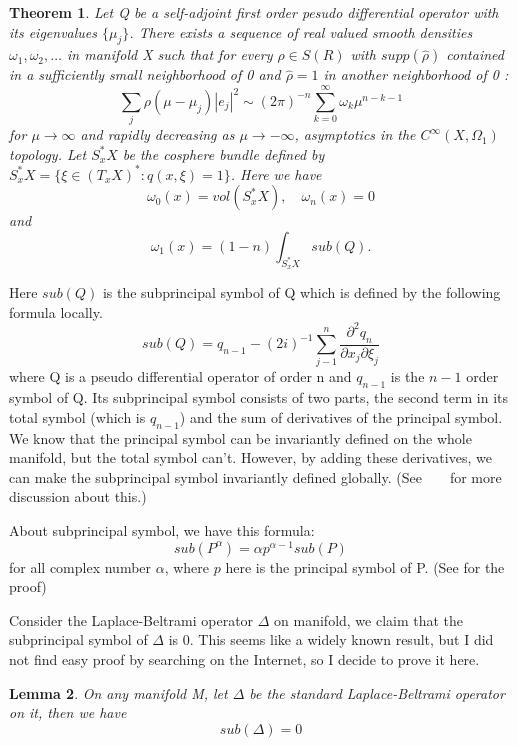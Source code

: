 \documentclass[10pt]{amsart}
\newtheorem{theorem}{Theorem}
\newtheorem{lemma}[theorem]{Lemma}
\newcommand{\1}{\mathbb{1}}
\begin{document}
\begin{theorem} \label{DG1}
    Let Q be a self-adjoint first order pesudo differential operator with its eigenvalues $\{\mu_j\}$. There exists a sequence of real valued smooth densities $\omega_1, \omega_2,\dots$ in manifold X such that for every $\rho \in S(R)$ with $supp(\hat{\rho})$ contained in a sufficiently small neighborhood of 0 and $\hat{\rho} = 1$ in another neighborhood of 0 :
    \[
    \sum_j \rho(\mu - \mu_j) |e_j|^2 \sim (2\pi)^{-n} \sum_{k=0}^{\infty} \omega_k \mu^{n-k-1}
    \]
    for $\mu \rightarrow \infty$ and rapidly decreasing as $\mu \rightarrow -\infty$, asymptotics in the $C^{\infty}(X,\Omega_1)$ topology. Let $S^*_xX$ be the cosphere bundle defined by $S^*_xX = \{ \xi \in (T_x X)^* : q(x,\xi) = 1\}$. Here we have 
    \[
    \omega_0(x) = vol(S^*_xX) , \quad \omega_n(x) = 0 
    \]
    and 
    \[
    \omega_1(x) = (1-n) \int_{S^*_xX} sub(Q).
    \]
\end{theorem}
Here $sub(Q)$ is the subprincipal symbol of Q which is defined by the following formula locally.
\begin{equation*}
    sub (Q )= q_{n-1} - (2i)^{-1} \sum_{j-1}^n \frac{\partial^2 q_n}{\partial x_j\partial \xi_j}
\end{equation*}
where Q is a pseudo differential operator of order n and $q_{n-1}$ is the $n-1$ order symbol of Q. Its subprincipal symbol consists of two parts, the second term in its total symbol (which is $q_{n-1}$) and the sum of derivatives of the principal symbol. We know that the principal symbol can be invariantly defined on the whole manifold, but the total symbol can't. However, by adding these derivatives, we can make the subprincipal symbol invariantly defined globally. (See ~\cite{FIO2} ~\cite{FIO1} for more discussion about this.)

About subprincipal symbol, we have this formula:
\begin{equation} \label{sub}
    sub(P^{\alpha}) = \alpha p^{\alpha -1} sub(P)
\end{equation}
for all complex number $\alpha$, where $p$ here is the principal symbol of P. (See \cite{DuistermaatGuillemin} for the proof)

Consider the Laplace-Beltrami operator $\Delta$ on manifold, we claim that the subprincipal symbol of $\Delta$ is 0. This seems like a widely known result, but I did not find easy proof by searching on the Internet, so I decide to prove it here.
\begin{lemma}\label{sublap}
    On any manifold M, let $\Delta$ be the standard Laplace-Beltrami operator on it, then we have
    \begin{equation}
        sub(\Delta) = 0
    \end{equation}
\end{lemma}
\end{document}
